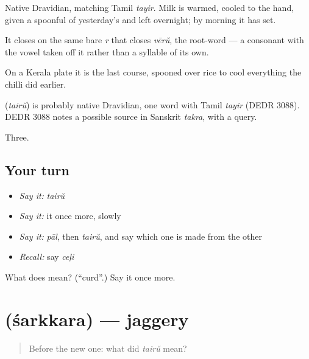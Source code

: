 Native Dravidian, matching Tamil \emph{tayir}. Milk is warmed, cooled to the hand, given a spoonful of yesterday's  and left overnight; by morning it has set.

It closes on the same bare \emph{r} that closes \emph{vērŭ}, the root-word — a consonant with the vowel taken off it rather than a syllable of its own.

On a Kerala plate it is the last course, spooned over rice to cool everything the chilli did earlier.

\begin{cousinweb}
\textbf{} (\emph{tairŭ}) is probably native Dravidian, one word with Tamil \emph{tayir} (DEDR 3088). DEDR 3088 notes a possible source in Sanskrit \emph{takra}, with a query.
\end{cousinweb}

\begin{grammarlens}[title={What you've built}]
Three.
\end{grammarlens}

\subsection*{Your turn}
\begin{itemize}
\raggedright
  \item \emph{Say it:} \emph{tairŭ}
  \item \emph{Say it:} it once more, slowly
  \item \emph{Say it:} \emph{pāl}, then \emph{tairŭ}, and say which one is made from the other
  \item \emph{Recall:} say \emph{ceḷi}
\end{itemize}

\begin{tcolorbox}[breakable,colback=teal!4,colframe=teal!35!black,title={Before you move on}]
What does  mean? (\textquotedblleft{}curd\textquotedblright{}.) Say it once more.
\end{tcolorbox}
\section[\texorpdfstring{\ml{ശർക്കര} (śarkkara)}{ശർക്കര (śarkkara)}]{ (śarkkara) — jaggery}

\label{lesson:ML-C61-jaggery}



\begin{quote}
Before the new one: what did \emph{tairŭ} mean?
\end{quote}

